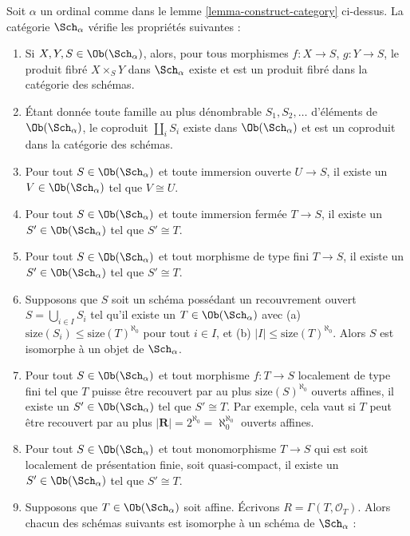 \begin{lemma}
\label{lemma-what-is-in-it}
Soit $\alpha$ un ordinal comme dans le lemme \ref{lemma-construct-category}
ci-dessus. La catégorie $\Sch_\alpha$ vérifie les propriétés suivantes :
\begin{enumerate}
\item Si $X, Y, S \in \Ob(\Sch_\alpha)$, alors, pour tous morphismes
$f : X \to S$, $g : Y \to S$, le produit fibré $X \times_S Y$ dans
$\Sch_\alpha$ existe et est un produit fibré dans la catégorie des schémas.
\item Étant donnée toute famille au plus dénombrable $S_1, S_2, \ldots$
d'éléments de $\Ob(\Sch_\alpha)$, le coproduit $\coprod_i S_i$ existe dans
$\Ob(\Sch_\alpha)$ et est un coproduit dans la catégorie des schémas.
\item Pour tout $S \in \Ob(\Sch_\alpha)$ et toute immersion ouverte
$U \to S$, il existe un $V \in \Ob(\Sch_\alpha)$ tel que $V \cong U$.
\item Pour tout $S \in \Ob(\Sch_\alpha)$ et toute immersion fermée
$T \to S$, il existe un $S' \in \Ob(\Sch_\alpha)$ tel que $S' \cong T$.
\item Pour tout $S \in \Ob(\Sch_\alpha)$ et tout morphisme de type fini
$T \to S$, il existe un $S' \in \Ob(\Sch_\alpha)$ tel que $S' \cong T$.
\item Supposons que $S$ soit un schéma possédant un recouvrement ouvert
$S = \bigcup_{i \in I} S_i$ tel qu'il existe un $T \in \Ob(\Sch_\alpha)$
avec (a) $\text{size}(S_i) \leq \text{size}(T)^{\aleph_0}$ pour tout
$i \in I$, et (b) $|I| \leq \text{size}(T)^{\aleph_0}$.
Alors $S$ est isomorphe à un objet de $\Sch_\alpha$.
\item Pour tout $S \in \Ob(\Sch_\alpha)$ et tout morphisme $f : T \to S$
localement de type fini tel que $T$ puisse être recouvert par au plus
$\text{size}(S)^{\aleph_0}$ ouverts affines, il existe un
$S' \in \Ob(\Sch_\alpha)$ tel que $S' \cong T$.
Par exemple, cela vaut si $T$ peut être recouvert par au plus
$|\mathbf{R}| = 2^{\aleph_0} = \aleph_0^{\aleph_0}$ ouverts affines.
\item Pour tout $S \in \Ob(\Sch_\alpha)$ et tout monomorphisme $T \to S$
qui est soit localement de présentation finie, soit quasi-compact, il existe
un $S' \in \Ob(\Sch_\alpha)$ tel que $S' \cong T$.
\item Supposons que $T \in \Ob(\Sch_\alpha)$ soit affine. Écrivons
$R = \Gamma(T, \mathcal{O}_T)$. Alors chacun des schémas suivants est
isomorphe à un schéma de $\Sch_\alpha$ :
\begin{enumerate}

\end{enumerate}
\end{enumerate}
\end{lemma}
